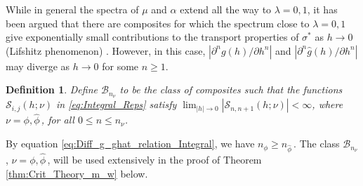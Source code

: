 \documentclass[english,12pt,jmp,graphicx]{revtex4-1}
\newtheorem{definition}{Definition}[section]
\newcommand{\ph}{\hat{\phi}}
\begin{document}
While in general the spectra of $\mu$ and $\alpha$  
extend all the way to $\lambda=0,1$, it has been argued that there are
composites for which the spectrum close to $\lambda=0,1$ give
exponentially small contributions to the transport properties of
$\sigma^*$ as $h\to0$ (Lifshitz phenomenon)
\cite{Clerc:AP-191,Jonckheere_Luck_JPA_1998}. However, in this case, 
$|\partial^ng(h)/ \partial h^n|$ and $|\partial^n\hat{g}(h)/ \partial h^n|$ may diverge as $h\to0$
for some $n\geq1$.   
%
\begin{definition}\label{def:Bounded_diff_g} 
%
Define $\mathcal{B}_{n_\nu}$ to be the class of composites such that the
functions $\mathcal{S}_{i,j}(h;\nu)$ in \eqref{eq:Integral_Reps} satisfy
$\lim_{|h|\to0}|\mathcal{S}_{n,n+1}(h;\nu)|<\infty$, where $\nu=\phi,\ph\,$, for all $0\leq n\leq n_\nu$.   
%
\end{definition}
%
By equation \eqref{eq:Diff_g_ghat_relation_Integral}, we have
$n_\phi\geq n_{\ph}\,$. The class $\mathcal{B}_{n_\nu}$, $\nu=\phi,\ph\,$, will be used extensively
in the proof of Theorem \ref{thm:Crit_Theory_m_w} below. 
% 
%
%
%
\end{document}
